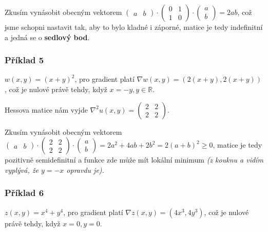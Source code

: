 \vspace{6pt}
\noindent Zkusím vynásobit obecným vektorem $\begin{pmatrix}
    a & b
\end{pmatrix} \cdot \begin{pmatrix}
    0 & 1 \\
    1 & 0
\end{pmatrix} \cdot \begin{pmatrix}
    a \\
    b
\end{pmatrix} = 2ab$, což jsme schopni nastavit tak, aby to bylo kladné i záporné, matice je tedy indefinitní a jedná se o \textbf{sedlový bod}.

\subsubsection*{Příklad 5}

$w(x,y) = (x + y)^2$, pro gradient platí $\nabla w(x, y) = \left(2(x + y), 2 (x + y)\right)$, což je nulové právě tehdy, když $x = -y, y \in \mathbb{R}$.

\vspace{6pt}
\noindent Hessova matice nám vyjde $\nabla^2 u(x, y) = \begin{pmatrix}
    2 & 2 \\
    2 & 2
\end{pmatrix}$.

\vspace{6pt}
\noindent Zkusím vynásobit obecným vektorem $\begin{pmatrix}
    a & b
\end{pmatrix} \cdot \begin{pmatrix}
    2 & 2 \\
    2 & 2
\end{pmatrix} \cdot \begin{pmatrix}
    a \\
    b
\end{pmatrix} = 2a^2 + 4ab + 2b^2 = 2(a + b)^2 \geq 0$, matice je tedy pozitivně semidefinitní a funkce zde může mít lokální minimum \textit{(z kouknu a vidím vyplývá, že $y = -x$ opravdu je).}

\subsubsection*{Příklad 6}

$z(x,y) = x^4 + y^4$, pro gradient platí $\nabla z(x, y) = (4x^3, 4y^3)$, což je nulové právě tehdy, když $x = 0, y = 0$.

